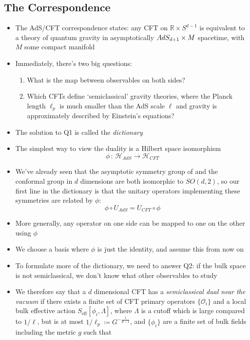 \documentclass[12pt,a4paper]{article}
\numberwithin{equation}{section}
\begin{document}
	\subsection{The Correspondence}
	\begin{itemize}
		\item The AdS/CFT correspondence states: any CFT on $\mathbb{R}\times S^{d-1}$ is equivalent to a theory of quantum gravity in asymptotically $AdS_{d+1}\times M$ spacetime, with $M$ some compact manifold
		\item Immediately, there's two big questions:
		\begin{enumerate}
			\item What is the map between observables on both sides?
			\item Which CFTs define `semiclassical' gravity theories, where the Planck length $\ell_{p}$ is much smaller than the AdS scale $\ell$ and gravity is approximately described by Einstein's equations?
		\end{enumerate}
		\item The solution to Q1 is called the \textit{dictionary}
		\item The simplest way to view the duality is a Hilbert space isomorphism 
		\begin{equation}
			\phi\,:\,\mathcal{H}_{AdS}\to\mathcal{H}_{CFT}
		\end{equation}
		\item We've already seen that the asymptotic symmetry group of \ads and the conformal group in $d$ dimensions are both isomorphic to $SO(d,2)$, so our first line in the dictionary is that the unitary operators implementing these symmetries are related by $\phi$:
		\begin{equation}
			\phi\circ U_{AdS}=U_{CFT}\circ\phi
		\end{equation}
		\item More generally, any operator on one side can be mapped to one on the other using $\phi$
		\item We choose a basis where $\phi$ is just the identity, and assume this from now on
		\item To formulate more of the dictionary, we need to answer Q2: if the bulk space is not semiclassical, we don't know what other observables to study
		\item We therefore say that a $d$ dimensional CFT has a \textit{semiclassical dual near the vacuum} if there exists a finite set of CFT primary operators $\{\mathcal{O}_{i}\}$ and a local bulk effective action $S_{\text{eff}}[\phi_{i},\Lambda]$, where $\Lambda$ is a cutoff which is large compared to $1/\ell$, but is at most $1/\ell_{p}\coloneqq G^{-\frac{1}{d-1}}$, and $\{\phi_{i}\}$ are a finite set of bulk fields including the metric $g$ such that

\end{itemize}
\end{document}
